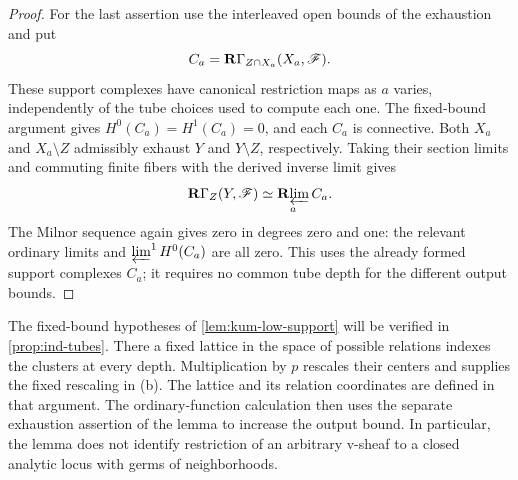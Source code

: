 \begin{proof}
For the last assertion use the interleaved open bounds of the
exhaustion and put
\[
 C_a=\mathbf R\Gamma_{Z\cap X_a}(X_a,\mathscr F).
\]
These support complexes have canonical restriction maps as $a$
varies, independently of the tube choices used to compute each one.
The fixed-bound argument gives $H^0(C_a)=H^1(C_a)=0$, and each $C_a$
is connective.  Both $X_a$ and $X_a\setminus Z$ admissibly exhaust
$Y$ and $Y\setminus Z$, respectively.  Taking their section limits
and commuting finite fibers with the derived inverse limit gives
\[
 \mathbf R\Gamma_Z(Y,\mathscr F)\simeq\mathop{\mathbf R\!\varprojlim}_a C_a.
\]
The Milnor sequence again gives zero in degrees zero and one:
the relevant ordinary limits and $\varprojlim^1 H^0(C_a)$ are all
zero.  This uses the already formed support complexes $C_a$;
it requires no common tube depth for the different output bounds.
\end{proof}

\begin{remark}\label{rem:kum-tube-interface}
The fixed-bound hypotheses of \cref{lem:kum-low-support} will be verified in
\cref{prop:ind-tubes}. There a fixed lattice in the space of possible
relations indexes the clusters at every depth. Multiplication by $p$
rescales their centers and supplies the fixed rescaling in (b).
The lattice and its relation coordinates are defined in that argument.
The ordinary-function calculation then uses the separate exhaustion
assertion of the lemma to increase the output bound.
In particular, the lemma does not identify restriction of an arbitrary
v-sheaf to a closed analytic locus with germs of neighborhoods.
\end{remark}

